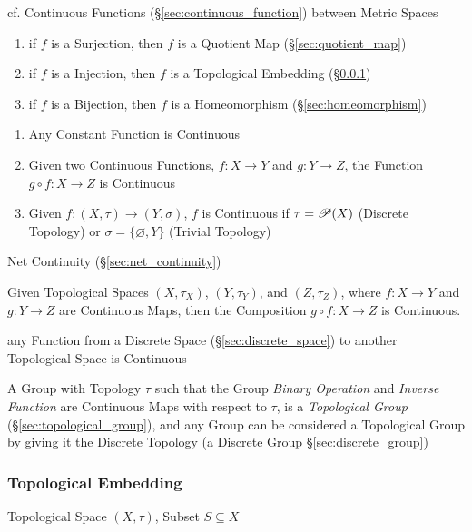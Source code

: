 \fist cf. Continuous Functions (\S\ref{sec:continuous_function}) between Metric
Spaces

\begin{enumerate}
  \item if $f$ is a Surjection, then $f$ is a Quotient Map
    (\S\ref{sec:quotient_map})
  \item if $f$ is a Injection, then $f$ is a Topological Embedding
    (\S\ref{sec:topological_embedding})
  \item if $f$ is a Bijection, then $f$ is a Homeomorphism
    (\S\ref{sec:homeomorphism})
\end{enumerate}

\begin{enumerate}
  \item Any Constant Function is Continuous
  \item Given two Continuous Functions, $f : X \rightarrow Y$ and $g
    : Y \rightarrow Z$, the Function $g \circ f : X \rightarrow Z$ is
    Continuous
  \item Given $f : (X, \tau) \rightarrow (Y, \sigma)$, $f$ is
    Continuous if $\tau = \mathscr{P}(X)$ (Discrete Topology) or
    $\sigma = \{\varnothing, Y\}$ (Trivial Topology)
\end{enumerate}

Net Continuity (\S\ref{sec:net_continuity})

Given Topological Spaces $(X, \tau_X)$, $(Y, \tau_Y)$, and $(Z,
\tau_Z)$, where $f: X \rightarrow Y$ and $g: Y \rightarrow Z$ are
Continuous Maps, then the Composition $g \circ f : X \rightarrow Z$ is
Continuous.

any Function from a Discrete Space (\S\ref{sec:discrete_space}) to another
Topological Space is Continuous

A Group with Topology $\tau$ such that the Group \emph{Binary Operation} and
\emph{Inverse Function} are Continuous Maps with respect to $\tau$, is a
\emph{Topological Group} (\S\ref{sec:topological_group}), and any Group can be
considered a Topological Group by giving it the Discrete Topology (a Discrete
Group \S\ref{sec:discrete_group})



\subsubsection{Topological Embedding}\label{sec:topological_embedding}

Topological Space $(X,\tau)$, Subset $S \subseteq X$

